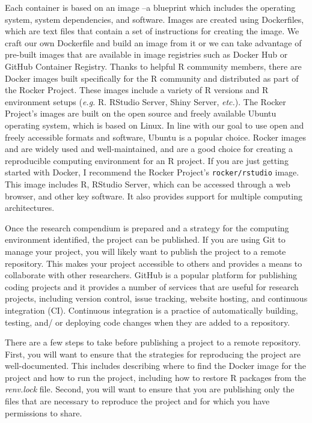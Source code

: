 \documentclass[
  letterpaper,
]{book}
\theoremstyle{definition}
\theoremstyle{remark}
\begin{document}
Each container is based on an image --a blueprint which includes the
operating system, system dependencies, and software. Images are created
using Dockerfiles, which are text files that contain a set of
instructions for creating the image. We craft our own Dockerfile and
build an image from it or we can take advantage of pre-built images that
are available in image registries such as Docker Hub or GitHub Container
Registry. Thanks to helpful R community members, there are Docker images
built specifically for the R community and distributed as part of the
Rocker Project. These images include a variety of R versions and R
environment setups (\emph{e.g.} R. RStudio Server, Shiny Server,
\emph{etc.}). The Rocker Project's images are built on the open source
and freely available Ubuntu operating system, which is based on Linux.
In line with our goal to use open and freely accessible formats and
software, Ubuntu is a popular choice. Rocker images and are widely used
and well-maintained, and are a good choice for creating a reproducible
computing environment for an R project. If you are just getting started
with Docker, I recommend the Rocker Project's \texttt{rocker/rstudio}
image. This image includes R, RStudio Server, which can be accessed
through a web browser, and other key software. It also provides support
for multiple computing architectures.

Once the research compendium is prepared and a strategy for the
computing environment identified, the project can be published. If you
are using Git to manage your project, you will likely want to publish
the project to a remote repository. This makes your project accessible
to others and provides a means to collaborate with other researchers.
GitHub is a popular platform for publishing coding projects and it
provides a number of services that are useful for research projects,
including version control, issue tracking, website hosting, and
continuous integration (CI). Continuous integration is a practice of
automatically building, testing, and/ or deploying code changes when
they are added to a repository.

There are a few steps to take before publishing a project to a remote
repository. First, you will want to ensure that the strategies for
reproducing the project are well-documented. This includes describing
where to find the Docker image for the project and how to run the
project, including how to restore R packages from the \emph{renv.lock}
file. Second, you will want to ensure that you are publishing only the
files that are necessary to reproduce the project and for which you have
permissions to share.
\end{document}
